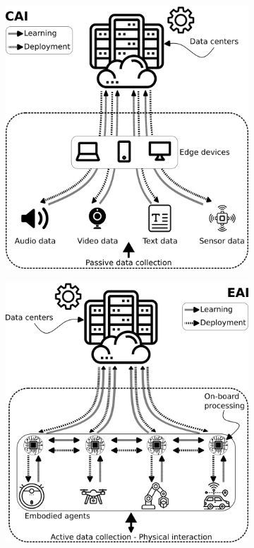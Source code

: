 \documentclass[12pt]{article}
\begin{document}
\begin{figure}[t!]
	\centering
	\hspace*{\fill}
	\begin{subfigure}[t]{0.45\textwidth}
		\subcaption{}
		\includegraphics[width= \textwidth]{cai_concept.png} \label{fig:cai}
	\end{subfigure}
	\hfill
	\begin{subfigure}[t]{0.45\textwidth}
		\subcaption{}
		\includegraphics[width= \textwidth]{eai_concept.png} \label{fig:eai}

\end{subfigure}
\end{figure}
\end{document}
